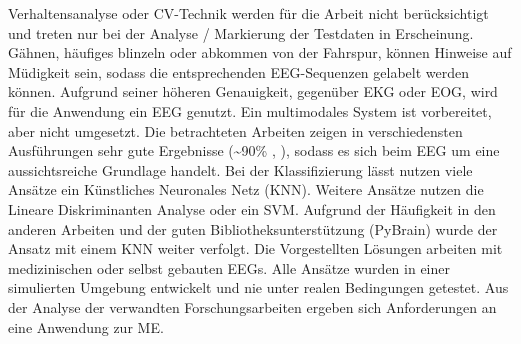 Verhaltensanalyse oder CV-Technik werden für die Arbeit nicht berücksichtigt und treten nur bei der Analyse / Markierung der Testdaten in Erscheinung. Gähnen, häufiges blinzeln oder abkommen von der Fahrspur, können Hinweise auf Müdigkeit sein, sodass die entsprechenden EEG-Sequenzen gelabelt werden können. 
Aufgrund seiner höheren Genauigkeit, gegenüber EKG oder EOG, wird für die Anwendung ein EEG genutzt. Ein multimodales System ist vorbereitet, aber nicht umgesetzt. Die betrachteten Arbeiten zeigen in verschiedensten Ausführungen sehr gute Ergebnisse (\textasciitilde 90\% \cite{Lin05eeg-baseddrowsiness}, \cite{Subasi:2005:ARA:1707423.1707550}), sodass es sich beim EEG um eine aussichtsreiche Grundlage handelt. 
Bei der Klassifizierung lässt nutzen viele Ansätze ein Künstliches Neuronales Netz  (KNN)\cite{Subasi:2005:ARA:1707423.1707550}\cite{Vuckovic2002349}\cite{wilson_890161}\cite{khalifa_893852}. Weitere Ansätze nutzen die Lineare Diskriminanten Analyse\cite{Vicente_6164509}\cite{Khushaba_5580017} oder ein SVM\cite{Park:2009:DDD:1667780.1667798}\cite{zhang_6513058}. Aufgrund der Häufigkeit in den anderen Arbeiten und der guten Bibliotheksunterstützung (PyBrain) wurde der Ansatz mit einem KNN weiter verfolgt. Die Vorgestellten Lösungen arbeiten mit medizinischen oder selbst gebauten EEGs. Alle Ansätze wurden in einer simulierten Umgebung entwickelt und nie unter realen Bedingungen getestet. Aus der Analyse der verwandten Forschungsarbeiten ergeben sich Anforderungen an eine Anwendung zur \acl{ME}. 